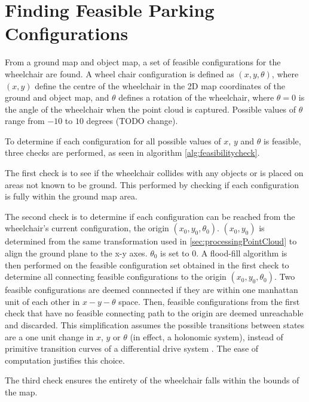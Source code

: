 \section{Finding Feasible Parking Configurations}
\label{sec:feasibleparkingspot}
From a ground map and object map, a set of feasible configurations for the
wheelchair are found. A wheel chair configuration is defined as $(x,y,\theta)$,
where $(x,y)$ define the centre of the wheelchair in the 2D map coordinates of
the ground and object map, and $\theta$ defines a rotation of the wheelchair,
where $\theta = 0$ is the angle of the wheelchair when the point cloud is
captured. Possible values of $\theta$ range from $-10$ to $10$ degrees (TODO
change).

To determine if each configuration for all possible values of $x$, $y$ and
$\theta$ is feasible, three checks are performed, as seen in algorithm
\autoref{alg:feasibilitycheck}. 

The first check is to see if the wheelchair
collides with any objects or is placed on areas not known to be ground. This
performed by checking if each configuration is fully within the ground map area.

The second check is to determine if each configuration can be reached from the
wheelchair's current configuration, the origin $(x_0,y_0,\theta_0)$. $(x_0,y_0)$
is determined from the same transformation used in
\autoref{sec:processingPointCloud} to align the ground plane to the x-y axes.
$\theta_0$ is set to $0$. A flood-fill algorithm is then performed on the
feasible configuration set obtained in the first check to determine all connecting
feasible configurations to the origin $(x_0,y_0,\theta_0)$. Two feasible
configurations are deemed connnected if they are within one manhattan unit of
each other in $x-y-\theta$ space.
Then, feasible configurations from the first check that have no feasible
connecting path to the origin are deemed unreachable and discarded. 
This simplification assumes the possible transitions between states are a one
unit change in $x$, $y$ or $\theta$ (in effect, a holonomic system), instead of
primitive transition curves of a differential drive system
\cite{balkcom2002time}. The ease of computation justifies this choice.


The third check ensures the entirety of the wheelchair falls within the bounds
of the map.


